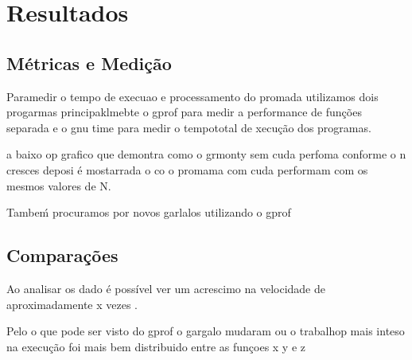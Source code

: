 \chapter{Resultados}
\label{cap:resultados}

\section{Métricas e Medição}
  Paramedir o tempo  de execuao e processamento  do promada utilizamos  dois progarmas principaklmebte o gprof para medir a performance de funções separada e o gnu time para medir o tempototal de xecução dos programas.

  a baixo op grafico que demontra como o grmonty sem cuda perfoma conforme o n cresces deposi é mostarrada o co o  promama com cuda performam  com os mesmos valores de N.

  Tambeḿ procuramos por novos garlalos utilizando o gprof

\section{Comparações}
  Ao analisar os dado é possível ver um acrescimo na velocidade de aproximadamente x vezes .

  Pelo o que pode ser visto do gprof o gargalo mudaram ou o trabalhop mais inteso na execução foi mais bem distribuido entre as funçoes x y e z
